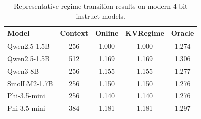 \begin{table}[t]
\centering
\caption{Representative regime-transition results on modern 4-bit instruct models.}
\label{tab:main-modern-results}
\begin{tabular}{lcccc}
\toprule
Model & Context & Online & KVRegime & Oracle \\
\midrule
Qwen2.5-1.5B & 256 & 1.000 & 1.000 & 1.274 \\
Qwen2.5-1.5B & 512 & 1.169 & 1.169 & 1.306 \\
Qwen3-8B & 256 & 1.155 & 1.155 & 1.277 \\
SmolLM2-1.7B & 256 & 1.150 & 1.150 & 1.276 \\
Phi-3.5-mini & 256 & 1.140 & 1.140 & 1.276 \\
Phi-3.5-mini & 384 & 1.181 & 1.181 & 1.297 \\
\bottomrule
\end{tabular}
\end{table}

